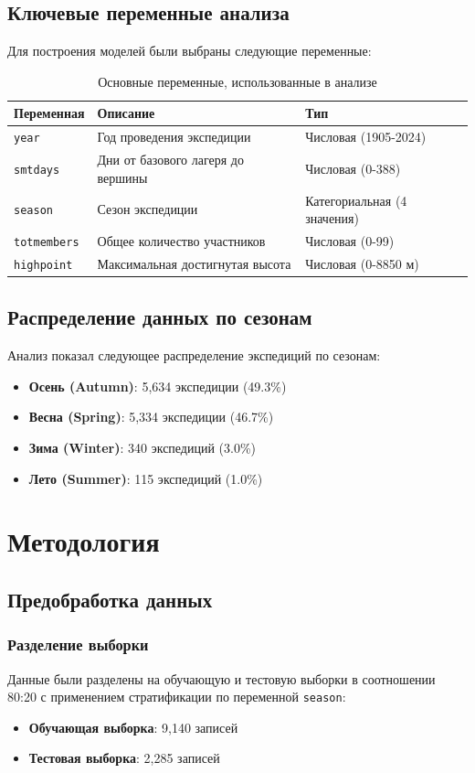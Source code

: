 \documentclass[12pt, a4paper]{article}
\begin{document}
\subsection{Ключевые переменные анализа}
Для построения моделей были выбраны следующие переменные:

\begin{table}[H]
\centering
\begin{tabular}{@{}lll@{}}
\toprule
Переменная & Описание & Тип \\
\midrule
\texttt{year} & Год проведения экспедиции & Числовая (1905-2024) \\
\texttt{smtdays} & Дни от базового лагеря до вершины & Числовая (0-388) \\
\texttt{season} & Сезон экспедиции & Категориальная (4 значения) \\
\texttt{totmembers} & Общее количество участников & Числовая (0-99) \\
\texttt{highpoint} & Максимальная достигнутая высота & Числовая (0-8850 м) \\
\bottomrule
\end{tabular}
\caption{Основные переменные, использованные в анализе}
\end{table}

\subsection{Распределение данных по сезонам}
Анализ показал следующее распределение экспедиций по сезонам:
\begin{itemize}
    \item \textbf{Осень (Autumn)}: 5,634 экспедиции (49.3\%)
    \item \textbf{Весна (Spring)}: 5,334 экспедиции (46.7\%)
    \item \textbf{Зима (Winter)}: 340 экспедиций (3.0\%)
    \item \textbf{Лето (Summer)}: 115 экспедиций (1.0\%)
\end{itemize}

\section{Методология}
\subsection{Предобработка данных}
\subsubsection{Разделение выборки}
Данные были разделены на обучающую и тестовую выборки в соотношении 80:20 с применением стратификации по переменной \texttt{season}:
\begin{itemize}
    \item \textbf{Обучающая выборка}: 9,140 записей
    \item \textbf{Тестовая выборка}: 2,285 записей
\end{itemize}
\end{document}
